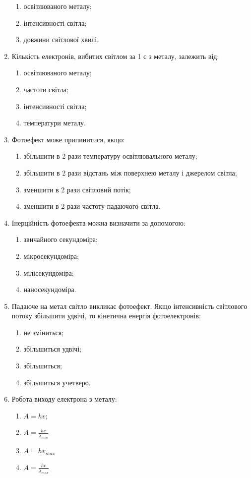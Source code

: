 \documentclass[twocolumn]{el-author}
\begin{document}
\begin{enumerate}
\begin{enumerate}
		\item освітлюваного металу;
		\item інтенсивності світла;
		\item довжини світлової хвилі.
	\end{enumerate}
	\item Кількість електронів, вибитих світлом за 1 с з металу, залежить від:
	\begin{enumerate}
		\item освітлюваного металу;
		\item частоти світла;
		\item інтенсивності світла;
		\item температури металу.
	\end{enumerate}
	\item Фотоефект може припинитися, якщо:
	\begin{enumerate}
		\item збільшити в 2 рази температуру освітлювального металу;
		\item збільшити в 2 рази відстань між поверхнею металу і джерелом світла;
		\item зменшити в 2 рази світловий потік;
		\item зменшити в 2 рази частоту падаючого світла.
	\end{enumerate}
	\item Інерційність фотоефекта можна визначити за допомогою:
	\begin{enumerate}
		\item звичайного секундоміра;
		\item мікросекундоміра;
		\item мілісекундоміра;
		\item наносекундоміра.
	\end{enumerate}
	\item Падаюче на метал світло викликає фотоефект. 
	Якщо інтенсивність світлового потоку збільшити удвічі, 
	то кінетична енергія фотоелектронів:
	\begin{enumerate}
		\item не зміниться;
		\item збільшиться удвічі;
		\item збільшиться; 
		\item збільшиться учетверо.
	\end{enumerate}
	\smallskip
	\item Робота виходу електрона з металу:
	\begin{enumerate}
		\item $A = hv$;
		\item $A = \frac{hc}{\lambda_{min}}$
		\item $A = hv_{max}$
		\item $A = \frac{hc}{\lambda_{max}}$
	\end{enumerate}
\end{enumerate}
\end{document}

